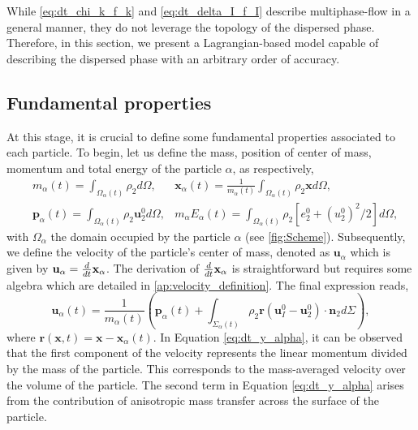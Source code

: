 
While \ref{eq:dt_chi_k_f_k} and \ref{eq:dt_delta_I_f_I} describe multiphase-flow in a general manner, they do not leverage the topology of the dispersed phase. 
Therefore, in this section, we present a Lagrangian-based model capable of describing the dispersed phase with an arbitrary order of accuracy.

\subsection{Fundamental properties}

At this stage, it is crucial to define some fundamental properties associated to each particle.
To begin, let us define the mass, position of center of mass, momentum and total energy of the particle $\alpha$, as respectively,
\begin{align}
    &m_\alpha(t)
    = \int_{\Omega_\alpha(t)} \rho_2  d\Omega,
    &\textbf{x}_\alpha(t)
    = \frac{1}{m_\alpha(t) }\int_{\Omega_\alpha(t)} \rho_2 \textbf{x} d\Omega,\\
    &\textbf{p}_\alpha(t) 
    = \int_{\Omega_\alpha(t)} \rho_2 \textbf{u}_2^0 d\Omega,
    & m_\alpha E_\alpha(t) 
    = \int_{\Omega_\alpha(t)} \rho_2 [e_2^0 + (u_2^0)^2/2] d\Omega,
    \label{eq:position_and_momentum_def}
\end{align}
with $\Omega_\alpha$ the domain occupied by the particle $\alpha$ (see \ref{fig:Scheme}). 
Subsequently, we define the velocity of the particle's center of mass, denoted as $\textbf{u}_\alpha$ which is given by $\textbf{u}_\alpha = \frac{d}{d t} \textbf{x}_\alpha$. 
The derivation of $\frac{d}{d t} \textbf{x}_\alpha$ is straightforward but requires some algebra which are detailed in \ref{ap:velocity_definition}. 
The final expression reads,
\begin{equation}
    \textbf{u}_\alpha(t) = \frac{1}{m_\alpha(t)} \left(
        \textbf{p}_\alpha(t)
        +  \int_{\Sigma_\alpha(t)} \rho_2 \textbf{r} (\textbf{u}_I^0 - \textbf{u}_2^0)\cdot \textbf{n}_2 d\Sigma
        \right),
        \label{eq:dt_y_alpha}
\end{equation}
where $\textbf{r}(\textbf{x},t) = \textbf{x} - \textbf{x}_\alpha(t)$. 
In Equation \ref{eq:dt_y_alpha}, it can be observed that the first component of the velocity represents the linear momentum divided by the mass of the particle. 
This corresponds to the mass-averaged velocity over the volume of the particle.
The second term in Equation \ref{eq:dt_y_alpha} arises from the contribution of anisotropic mass transfer across the surface of the particle. 
